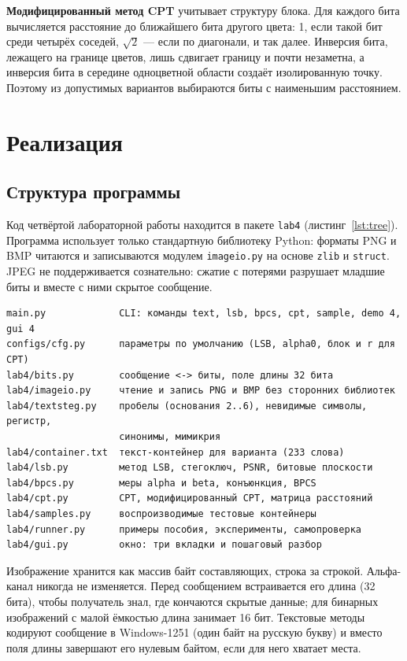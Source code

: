 \documentclass[14pt,a4paper]{extarticle}
\begin{document}
\textbf{Модифицированный метод CPT} учитывает структуру блока. Для каждого бита
вычисляется расстояние до ближайшего бита другого цвета: 1, если такой бит среди
четырёх соседей, $\sqrt{2}$ --- если по диагонали, и так далее. Инверсия бита,
лежащего на границе цветов, лишь сдвигает границу и почти незаметна, а инверсия бита в
середине одноцветной области создаёт изолированную точку. Поэтому из допустимых
вариантов выбираются биты с наименьшим расстоянием.

\section{Реализация}

\subsection{Структура программы}

Код четвёртой лабораторной работы находится в пакете \texttt{lab4}
(листинг~\ref{lst:tree}). Программа использует только стандартную библиотеку Python:
форматы PNG и BMP читаются и записываются модулем \texttt{imageio.py} на основе
\texttt{zlib} и \texttt{struct}. JPEG не поддерживается сознательно: сжатие с потерями
разрушает младшие биты и вместе с ними скрытое сообщение.

\begin{Verbatim}[fontsize=\footnotesize, frame=single, samepage=true]
main.py             CLI: команды text, lsb, bpcs, cpt, sample, demo 4, gui 4
configs/cfg.py      параметры по умолчанию (LSB, alpha0, блок и r для CPT)
lab4/bits.py        сообщение <-> биты, поле длины 32 бита
lab4/imageio.py     чтение и запись PNG и BMP без сторонних библиотек
lab4/textsteg.py    пробелы (основания 2..6), невидимые символы, регистр,
                    синонимы, мимикрия
lab4/container.txt  текст-контейнер для варианта (233 слова)
lab4/lsb.py         метод LSB, стегоключ, PSNR, битовые плоскости
lab4/bpcs.py        меры alpha и beta, конъюнкция, BPCS
lab4/cpt.py         CPT, модифицированный CPT, матрица расстояний
lab4/samples.py     воспроизводимые тестовые контейнеры
lab4/runner.py      примеры пособия, эксперименты, самопроверка
lab4/gui.py         окно: три вкладки и пошаговый разбор
\end{Verbatim}

Изображение хранится как массив байт составляющих, строка за строкой. Альфа-канал
никогда не изменяется. Перед сообщением встраивается его длина (32 бита), чтобы
получатель знал, где кончаются скрытые данные; для бинарных изображений с малой
ёмкостью длина занимает 16 бит. Текстовые методы кодируют сообщение в Windows-1251
(один байт на русскую букву) и вместо поля длины завершают его нулевым байтом, если
для него хватает места.
\end{document}
